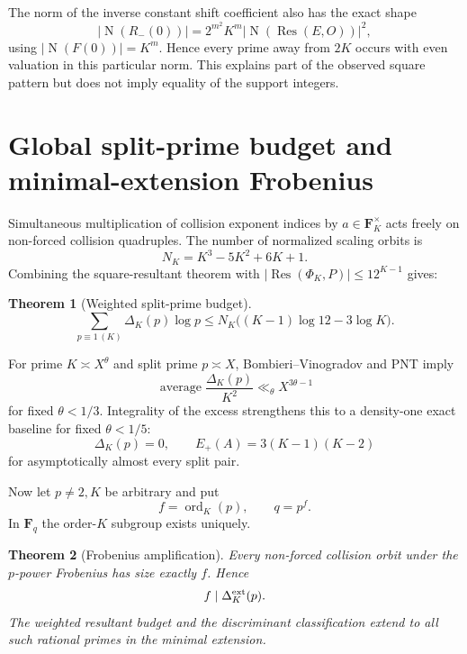 \documentclass[11pt]{article}
\newtheorem{theorem}{Theorem}[section]
\newcommand{\Res}{\operatorname{Res}}
\newcommand{\Norm}{\operatorname{N}}
\newcommand{\ord}{\operatorname{ord}}
\begin{document}
The norm of the inverse constant shift coefficient also has the exact shape
\begin{equation}\label{eq:inverse-norm}
\left|\Norm(R_-(0))\right|
 =2^{m^2}K^m\left|\Norm(\Res(E,O))\right|^2,
\end{equation}
using $|\Norm(F(0))|=K^m$.  Hence every prime away from $2K$ occurs with even
valuation in this particular norm.  This explains part of the observed square
pattern but does not imply equality of the support integers.

\section{Global split-prime budget and minimal-extension Frobenius}

Simultaneous multiplication of collision exponent indices by
$a\in\mathbf F_K^\times$ acts freely on non-forced collision quadruples.  The
number of normalized scaling orbits is
\[
N_K=K^3-5K^2+6K+1.
\]
Combining the square-resultant theorem with $|\Res(\Phi_K,P)|\le12^{K-1}$
gives:

\begin{theorem}[Weighted split-prime budget]\label{thm:budget}
\begin{equation}\label{eq:budget}
\sum_{p\equiv1\,(K)}\Delta_K(p)\log p
\le N_K\bigl((K-1)\log12-3\log K\bigr).
\end{equation}
\end{theorem}

For prime $K\asymp X^\theta$ and split prime $p\asymp X$,
Bombieri--Vinogradov and PNT \cite{Bombieri1965,IK2004} imply
\[
\operatorname{average}\frac{\Delta_K(p)}{K^2}
 \ll_\theta X^{3\theta-1}
\]
for fixed $\theta<1/3$.  Integrality of the excess strengthens this to a
density-one exact baseline for fixed $\theta<1/5$:
\[
\Delta_K(p)=0,
\qquad
E_+(A)=3(K-1)(K-2)
\]
for asymptotically almost every split pair.

Now let $p\ne2,K$ be arbitrary and put
\[
f=\ord_K(p),\qquad q=p^f.
\]
In $\mathbf F_q$ the order-$K$ subgroup exists uniquely.

\begin{theorem}[Frobenius amplification]\label{thm:frob}
Every non-forced collision orbit under the $p$-power Frobenius has size exactly
$f$.  Hence
\[
f\mid\Delta_K^{\rm ext}(p).
\]
The weighted resultant budget and the discriminant classification extend to
all such rational primes in the minimal extension.
\end{theorem}
\end{document}
